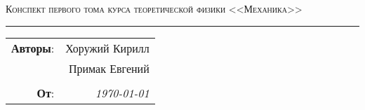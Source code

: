 \vspace{2cm}

\begin{center}
    \LARGE \textsc{Конспект первого тома курса теоретической физики <<Механика>>}
\end{center}

\hrule

\begin{flushright}
    \begin{tabular}{rr}
        \textbf{Авторы}: 
        & Хоружий Кирилл \\
        & Примак Евгений \\
        &\\
        \textbf{От}: &
        \textit{\today}\\
    \end{tabular}
\end{flushright}

\thispagestyle{empty}
\tableofcontents
\newpage